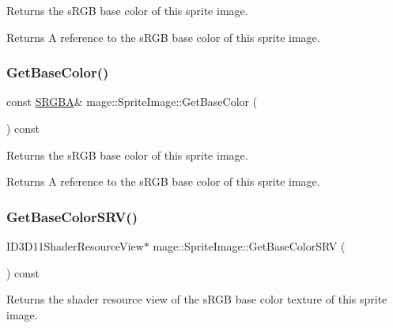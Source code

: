 Returns the s\+R\+GB base color of this sprite image.

\begin{DoxyReturn}{Returns}
A reference to the s\+R\+GB base color of this sprite image. 
\end{DoxyReturn}
\hypertarget{classmage_1_1_sprite_image_a72e5087fc7f6bc1668980c5c35815906}{}\label{classmage_1_1_sprite_image_a72e5087fc7f6bc1668980c5c35815906} 
\subsubsection{\texorpdfstring{Get\+Base\+Color()}{GetBaseColor()}\hspace{0.1cm}{\footnotesize\ttfamily [2/2]}}
{\footnotesize\ttfamily const \hyperlink{structmage_1_1_s_r_g_b_a}{S\+R\+G\+BA}\& mage\+::\+Sprite\+Image\+::\+Get\+Base\+Color (\begin{DoxyParamCaption}{ }\end{DoxyParamCaption}) const\hspace{0.3cm}{\ttfamily [noexcept]}}

Returns the s\+R\+GB base color of this sprite image.

\begin{DoxyReturn}{Returns}
A reference to the s\+R\+GB base color of this sprite image. 
\end{DoxyReturn}
\hypertarget{classmage_1_1_sprite_image_a955225e8274ae5f39f6eb6f6fbb75638}{}\label{classmage_1_1_sprite_image_a955225e8274ae5f39f6eb6f6fbb75638} 
\subsubsection{\texorpdfstring{Get\+Base\+Color\+S\+R\+V()}{GetBaseColorSRV()}}
{\footnotesize\ttfamily I\+D3\+D11\+Shader\+Resource\+View$\ast$ mage\+::\+Sprite\+Image\+::\+Get\+Base\+Color\+S\+RV (\begin{DoxyParamCaption}{ }\end{DoxyParamCaption}) const\hspace{0.3cm}{\ttfamily [noexcept]}}

Returns the shader resource view of the s\+R\+GB base color texture of this sprite image.

